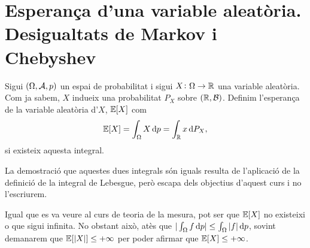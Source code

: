 \section[Esperança d'una variable aleatòria. Desigualtats de Markov i Chebyshev]
    {Esperança d'una variable aleatòria. Desigualtats de Markov i Chebyshev
    }

\begin{defi}
    Sigui $(\Omega,\mathcal{A},p)$ un espai de probabilitat i sigui $X\colon\Omega\to\mathbb{R}$ una variable aleatòria. Com ja sabem, $X$ indueix una probabilitat $P_X$ sobre $\left(\mathbb{R},\mathcal{B}\right)$. Definim l'esperança de la variable aleatòria d'$X$, $\operatorname{\mathbb{E}}[X]$ com
    \[
        \esp[X] = \int_{\Omega}{X \dif p} = \int_{\real}{x \dif P_X},
    \]
    si existeix aquesta integral.
\end{defi}

\begin{obs}
    La demostració que aquestes dues integrals són iguals resulta de l'aplicació de la definició de la integral de Lebesgue, però escapa dels objectius d'aquest curs i no l'escriurem.
\end{obs}

\begin{obs}
    Igual que es va veure al curs de teoria de la mesura, pot ser que $\operatorname{\mathbb{E}}[X]$ no existeixi o que sigui infinita.
    No obstant això, atès que $|\int_{\Omega}{f\dif p}| \le \int_{\Omega}{|f|\dif p}$, sovint demanarem que
    $\operatorname{\mathbb{E}}[|X|] \le +\infty$ per poder afirmar que $\operatorname{\mathbb{E}}[X] \le +\infty$.
\end{obs}

